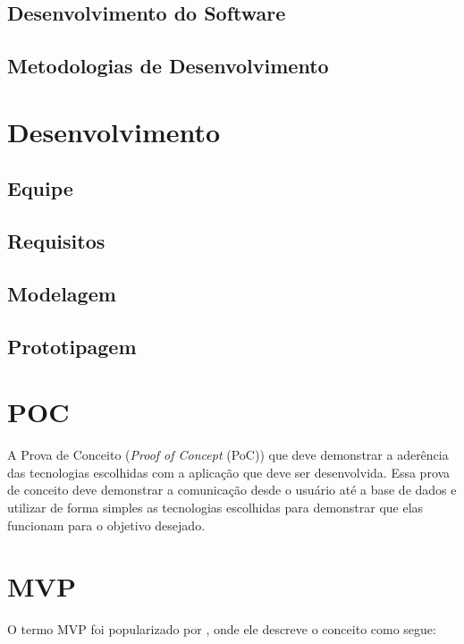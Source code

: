 \documentclass[
	article,			%
	12pt,				%
	oneside,			%
	a4paper,			%
    BIBLATEX,           %
	english,			%
	brazil,				%
	sumario=tradicional
	]{abntex2}
\begin{document}
\subsection{Desenvolvimento do Software}
\lipsum[1]

\subsection{Metodologias de Desenvolvimento}
\lipsum[1]

\section{Desenvolvimento}

\subsection{Equipe}
\lipsum[1]

\subsection{Requisitos}
\lipsum[1]

\subsection{Modelagem}
\lipsum[1]

\subsection{Prototipagem}
\lipsum[1]

\section{POC}

A Prova de Conceito (\textit{Proof of Concept} (PoC)) que deve demonstrar a aderência das tecnologias escolhidas com a aplicação que deve ser desenvolvida. Essa prova de conceito deve demonstrar a comunicação desde o usuário até a base de dados e utilizar de forma simples as tecnologias escolhidas para demonstrar que
elas funcionam para o objetivo desejado.

\section{MVP}

O termo MVP foi popularizado por  , onde ele descreve o conceito como segue:
\end{document}
